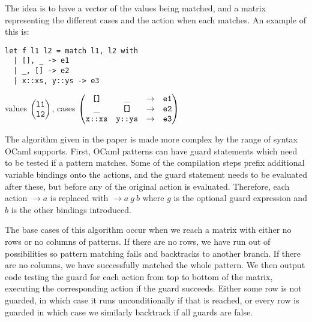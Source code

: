 The idea is to have a vector of the values being matched, and a matrix representing the different cases and the action when each matches. An example of this is:

\begin{minipage}{0.45\textwidth}
\begin{verbatim}
let f l1 l2 = match l1, l2 with
  | [], _ -> e1
  | _, [] -> e2
  | x::xs, y::ys -> e3
\end{verbatim}
\end{minipage}
\begin{minipage}{0.55\textwidth}
 values $\begin{pmatrix}
\verb|l1| \\
\verb|l2|
\end{pmatrix}$, cases
$\begin{pmatrix}
\verb|[]| & \_ & \to & \verb|e1| \\
\_ & \verb|[]| & \to & \verb|e2| \\
\verb|x::xs| & \verb|y::ys| & \to & \verb|e3| \\
\end{pmatrix}$
\end{minipage}

The algorithm given in the paper is made more complex by the range of syntax OCaml supports. %
First, OCaml patterns can have guard statements which need to be tested if a pattern matches. Some of the compilation steps prefix additional variable bindings onto the actions, and the guard statement needs to be evaluated after these, but before any of the original action is evaluated. Therefore, each action $\to a$ is replaced with $\to a \ g \ b$ where $g$ is the optional guard expression and $b$ is the other bindings introduced.

The base cases of this algorithm occur when we reach a matrix with either no rows or no columns of patterns. If there are no rows, we have run out of possibilities so pattern matching fails and backtracks to another branch. If there are no columns, we have successfully matched the whole pattern. We then output code testing the guard for each action from top to bottom of the matrix, executing the corresponding action if the guard succeeds. Either some row is not guarded, in which case it runs unconditionally if that is reached, or every row is guarded in which case we similarly backtrack if all guards are false.

